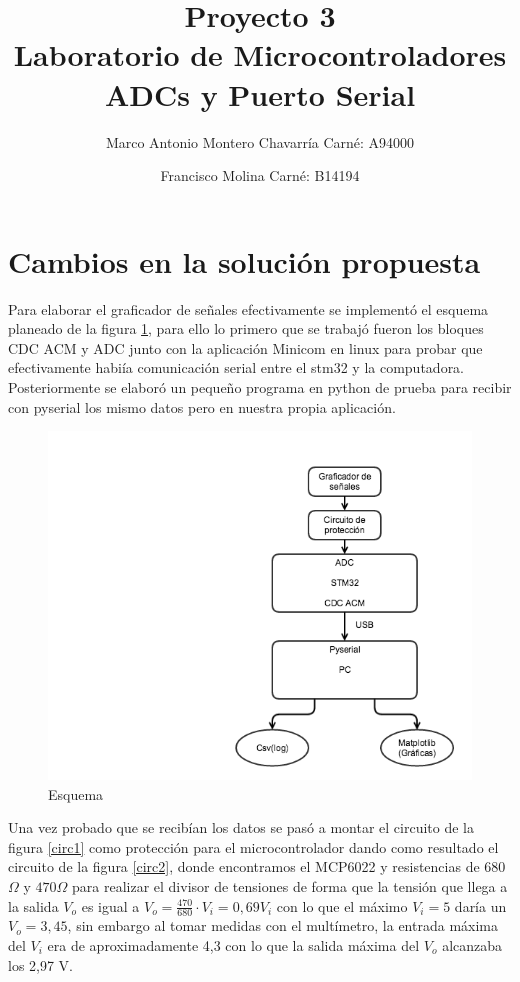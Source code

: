 \documentclass[letterpaper]{article}
\begin{document}
\title{Proyecto 3\\ Laboratorio de Microcontroladores ADCs y Puerto Serial}
\author{
 Marco Antonio Montero Chavarría Carné: A94000\\
  \and
  Francisco Molina Carné: B14194\\  
}
\maketitle

\section{Cambios en la solución propuesta}
Para elaborar el graficador de señales efectivamente se implementó el esquema planeado de la figura \ref{diag1}, para ello lo primero que se trabajó fueron los bloques CDC ACM y ADC junto con la aplicación Minicom en linux para probar que efectivamente habiía comunicación serial entre el stm32 y la computadora. Posteriormente se elaboró un pequeño programa en python de prueba para recibir con pyserial los mismo datos pero en nuestra propia aplicación. \\[0.2 cm]

\begin{figure}[hbtp]
\centering
\includegraphics[width=8 cm]{flowdiag.png}
\caption{Esquema}
\label{diag1}
\end{figure}

\newpage

Una vez probado que se recibían los datos se pasó a montar el circuito de la figura \ref{circ1} como protección para el microcontrolador dando como resultado el circuito de la figura \ref{circ2}, donde encontramos el MCP6022 y resistencias de 680$\Omega$ y $470\Omega$ para realizar el divisor de tensiones de forma que la tensión que llega a la salida $V_o$ es igual a $V_o = \frac{470}{680} \cdot V_i = 0,69 V_i$ con lo que el máximo $V_i=5$ daría un $V_o=3,45$, sin embargo al tomar medidas con el multímetro, la entrada máxima del $V_i$ era de aproximadamente 4,3 con lo que la salida máxima del $V_o$ alcanzaba los 2,97 V. \\[0.2 cm]
\end{document}
